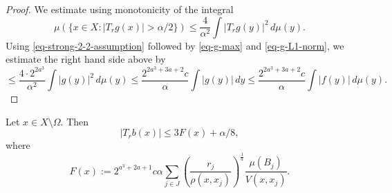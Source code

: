 \begin{proof}
    We estimate using monotonicity of the integral
\begin{equation*}
     \mu\left(\{x\in X: |T_r g(x)|>{\alpha}/2\}\right)\leq \frac{4}{\alpha^2} \int |T_r g(y)|^2\, d\mu(y).
\end{equation*}
Using \eqref{eq-strong-2-2-assumption} followed by \eqref{eq-g-max} and \eqref{eq-g-L1-norm}, we estimate the right hand side above by
\begin{equation}
    \label{eq-Hr-g}
    \leq \frac{4\cdot 2^{2a^3}}{\alpha^2} \int |g(y)|^2\, d\mu(y)\leq \frac{2^{2a^3+3a+2}c}{\alpha} \int |g(y)|\, dy \le \frac{2^{2a^3+3a+2}c}{\alpha} \int |f(y)|\, d\mu(y).
\end{equation}
\end{proof}

\begin{lemma}
    \label{estimate-Tr-bad-X-minus-Omega}
    Let $x\in X\setminus\Omega$. Then
    \begin{equation*}
        |T_rb(x)| \le 3F(x)+\alpha/8,
    \end{equation*}
    where
    \begin{equation*}
        F(x) := 2^{a^3+2a+1} c\alpha \sum_{j\in J} \left(\frac{r_j}{\rho(x,x_j)}\right)^{\frac{1}{a}}\frac{\mu(B_j)}{V(x,x_j)}.
    \end{equation*}
\end{lemma}

